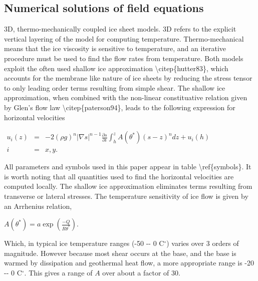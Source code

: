 






\subsection{Numerical solutions of field equations}

3D, thermo-mechanically coupled ice sheet models. 3D refers to the
explicit vertical layering of the model for computing temperature.
Thermo-mechanical means that the ice viscosity is sensitive to
temperature, and an iterative procedure must be used to find the flow
rates from temperature. Both models exploit the often used shallow ice
approximation \textbackslash{}citep\{hutter83\}, which accounts for the
membrane like nature of ice sheets by reducing the stress tensor to only
leading order terms resulting from simple shear. The shallow ice
approximation, when combined with the non-linear constituative relation
given by Glen's flow law \textbackslash{}citep\{paterson94\}, leads to
the following expression for horizontal velocities

$\begin{matrix}
u_i(z) &=& -2 (\rho g)^n \vert \nabla s\vert ^{n-1} \frac{\partial s}{\partial i} 
\int_h^z A(\theta^*)(s-z)^n dz + u_i(h)\\
i &=& x,y.
\end{matrix}$

All parameters and symbols used in this paper appear in table
\textbackslash{}ref\{symbols\}. It is worth noting that all quantities
used to find the horizontal velocities are computed locally. The shallow
ice approximation eliminates terms resulting from transverse or lateral
stresses. The temperature sensitivity of ice flow is given by an
Arrhenius relation,

$
A(\theta^*) = a \exp \left(\frac{-Q}{R\theta^*}\right).
$

Which, in typical ice temperature ranges (-50 -{}- 0 C$^\circ$) varies
over 3 orders of magnitude. However because most shear occurs at the
base, and the base is warmed by dissipation and geothermal heat flow, a
more appropriate range is -20 -{}- 0 C$^\circ$. This gives a range of
$A$ over about a factor of 30.

